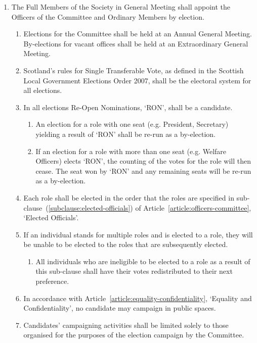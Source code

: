 \documentclass[12pt]{constitution}
\begin{document}
\begin{enumerate}
    \item The Full Members of the Society in General Meeting shall appoint the Officers of the Committee and Ordinary Members by election.
    \begin{enumerate}
        \item Elections for the Committee shall be held at an Annual General Meeting. By-elections for vacant offices shall be held at an Extraordinary General Meeting.
        \item Scotland's rules for Single Transferable Vote, as defined in the Scottish Local Government Elections Order 2007, shall be the electoral system for all elections.
        \item In all elections Re-Open Nominations, `RON', shall be a candidate.
        \begin{enumerate}
            \item An election for a role with one seat (e.g. President, Secretary) yielding a result of `RON' shall be re-run as a by-election.
            \item If an election for a role with more than one seat (e.g. Welfare Officers) elects `RON', the counting of the votes for the role will then cease. The seat won by `RON' and any remaining seats will be re-run as a by-election.
        \end{enumerate}
        \item Each role shall be elected in the order that the roles are specified in sub-clause~(\ref{subclause:elected-officials}) of Article~\ref{article:officers-committee}, `Elected Officials'.
        \item If an individual stands for multiple roles and is elected to a role, they will be unable to be elected to the roles that are subsequently elected.
        \begin{enumerate}
            \item All individuals who are ineligible to be elected to a role as a result of this sub-clause shall have their votes redistributed to their next preference.
        \end{enumerate}
        \item In accordance with Article~\ref{article:equality-confidentiality}, `Equality and Confidentiality', no candidate may campaign in public spaces.
        \item Candidates' campaigning activities shall be limited solely to those organised for the purposes of the election campaign by the Committee.

\end{enumerate}
\end{enumerate}
\end{document}

